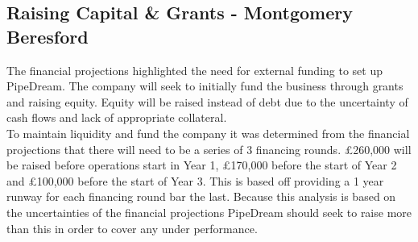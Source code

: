 \documentclass[11pt]{article}		%
\newcommand{\figref}[1]{\hyperref[#1]{Figure \ref*{#1}}}    %
\begin{document}
		            
				
				
			    
		\subsection[Raising Capital \& Grants]{Raising Capital \& Grants - Montgomery Beresford} \label{raisingFunds}
		
		  The financial projections highlighted the need for external funding to set up PipeDream. The company will seek to initially fund the business through grants and raising equity. Equity will be raised instead of debt due to the uncertainty of cash flows and lack of appropriate collateral.
		\\ 
        \hspace*{2ex}To maintain liquidity and fund the company it was determined from the financial projections that there will need to be a series of 3 financing rounds. £260,000 will be raised before operations start in Year 1, £170,000 before the start of Year 2 and £100,000 before the start of Year 3. This is based off providing a 1 year runway for each financing round bar the last. Because this analysis is based on the uncertainties of the financial projections PipeDream should seek to raise more than this in order to cover any under performance.%
 
\end{document}
